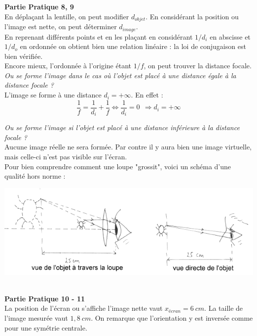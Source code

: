 \documentclass	[11pt, a4paper, openany]{book}
\begin{document}
		\textbf{Partie Pratique 8, 9}\\
		En déplaçant la lentille, on peut modifier $d_{objet}$. En considérant la position ou l'image est nette, on peut déterminer $d_{image}$.\\
		En reprenant différents points et en les plaçant en considérant $1/d_i$ en abscisse et $1/d_o$ en ordonnée on obtient bien une relation linéaire : la loi de conjugaison est bien vérifiée.\\
		Encore mieux, l'ordonnée à l'origine étant $1/f$, on peut trouver la distance focale.\\
		
		\textit{Ou se forme l'image dans le cas où l'objet est placé à une distance égale à la distance focale ? }\\
		L'image se forme à une distance $d_i = + \infty$. En effet : 
		\begin{equation}
			\frac{1}{f} = \frac{1}{d_i} + \frac{1}{f} \Leftrightarrow \frac{1}{d_i} = 0\ \ \Rightarrow d_i = +\infty
		\end{equation}
		
		\textit{Ou se forme l'image si l'objet est placé à une distance inférieure à la distance focale ?}\\
		Aucune image réelle ne sera formée. Par contre il y aura bien une image virtuelle, mais celle-ci n'est pas visible sur l'écran.\\
		Pour bien comprendre comment une loupe "grossit", voici un schéma d'une qualité hors norme : 
		\begin{center}
			\includegraphics[scale=0.6]{labo/image32.png}
		\end{center}\ \\
		
		\textbf{Partie Pratique 10 - 11}\\
		La position de l'écran ou s'affiche l'image nette vaut $x_{écran} = 6\ cm$. La taille de l'image mesurée vaut $1,8\ cm$. On remarque que l'orientation y est inversée comme pour une symétrie centrale.\\
		
\end{document}
